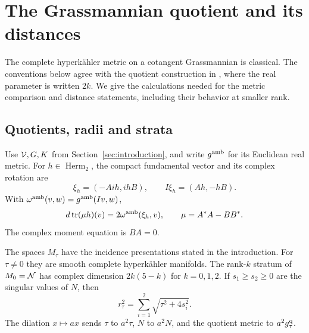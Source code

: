 \section{The Grassmannian quotient and its distances}\label{sec:model}

The complete hyperk\"ahler metric on a cotangent Grassmannian is
classical. The conventions below agree with the quotient construction
in \cite[\S2.2]{BG96}, where the real parameter is written $2k$.
We give the calculations needed for the metric comparison and distance
statements, including their behavior at smaller rank.

\subsection{Quotients, radii and strata}

Use $\mathcal V,G,K$ from Section~\ref{sec:introduction}, and write
$g^{\rm amb}$ for its Euclidean real metric. For $h\in\operatorname{Herm}_2$,
the compact fundamental vector and its complex rotation are
\begin{equation}\label{eq:fundamental}
\xi_h=(-Aih,ihB),\qquad I\xi_h=(Ah,-hB).
\end{equation}
With $\omega^{\rm amb}(v,w)=g^{\rm amb}(Iv,w)$,
\[
d\operatorname{tr}(\mu h)(v)=2\omega^{\rm amb}(\xi_h,v),\qquad
\mu=A^*A-BB^*.
\]
The complex moment equation is $BA=0$.

\begin{proposition}\label{prop:finite-geometry}
The spaces $M_\tau$ have the incidence presentations stated in the
introduction. For $\tau\ne0$ they are smooth complete hyperk\"ahler
manifolds. The rank-$k$ stratum of $M_0=\mathcal N$ has complex dimension
$2k(5-k)$ for $k=0,1,2$. If $s_1\ge s_2\ge0$ are the singular values
of $N$, then
\begin{equation}\label{eq:radius}
r_\tau^2=\sum_{i=1}^2\sqrt{\tau^2+4s_i^2}.
\end{equation}
The dilation $x\mapsto ax$ sends $\tau$ to $a^2\tau$, $N$ to $a^2N$,
and the quotient metric to $a^2g_\tau^{\rm q}$.
\end{proposition}

